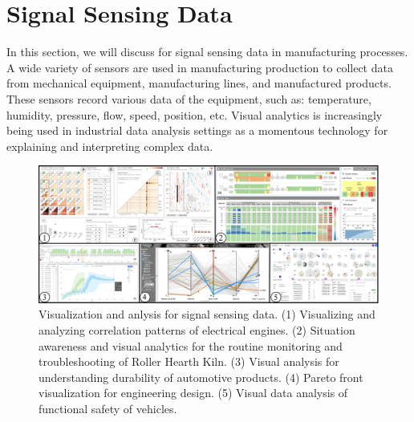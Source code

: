 \documentclass[a4paper,fleqn]{cas-dc}
\begin{document}
\section{Signal Sensing Data}
In this section, we will discuss for signal sensing data in manufacturing processes.
A wide variety of sensors are used in manufacturing production to collect data from mechanical equipment, manufacturing lines, and manufactured products.
These sensors record various data of the equipment, such as: temperature, humidity, pressure, flow, speed, position, etc.
Visual analytics is increasingly being used in industrial data analysis settings as a momentous technology for explaining and interpreting complex data.

\begin{figure}
	\centering
	\includegraphics[width=\textwidth]{Images/signal data.pdf}
	\vspace{-1em}
	\caption{Visualization and anlysis for signal sensing data. (1) Visualizing and analyzing correlation patterns of	electrical engines. (2) Situation awareness and visual analytics for the routine monitoring and troubleshooting of Roller Hearth Kiln. (3) Visual analysis for understanding durability of automotive products. (4) Pareto front visualization for engineering design. (5) Visual data analysis of functional safety of vehicles.}
	\label{fig:signaldata}
	\vspace{-1.5em}
\end{figure}


\end{document}
